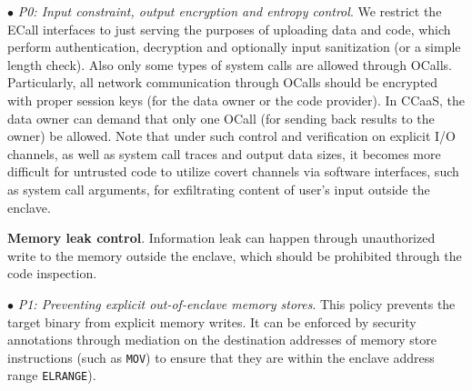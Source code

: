 \vspace{2pt}\noindent$\bullet$\textit{ P0: Input constraint, output encryption and entropy control}.
We restrict the ECall interfaces to just serving the purposes of uploading data and code, which perform authentication, decryption and optionally input sanitization (or a simple length check). Also only some types of system calls are allowed through OCalls. Particularly, all network communication through OCalls should be encrypted with proper session keys (for the data owner or the code provider). In CCaaS, the data owner can demand that only one OCall (for sending back results to the owner) be allowed. Note that under such control and verification on explicit I/O channels, as well as system call traces and output data sizes, it becomes more difficult for untrusted code to utilize covert channels via software interfaces, such as system call arguments, for exfiltrating content of user’s input outside the enclave.


\vspace{3pt}\noindent\textbf{Memory leak control}. Information leak can happen through unauthorized write to the memory outside the enclave, which should be prohibited through the code inspection. 


\vspace{2pt}\noindent$\bullet$\textit{ P1: Preventing explicit out-of-enclave memory stores}. This policy prevents the target binary from explicit memory writes. It can be enforced by security annotations through mediation on the destination addresses of memory store instructions (such as \texttt{MOV}) to ensure that they are within the enclave address range \texttt{ELRANGE}).

